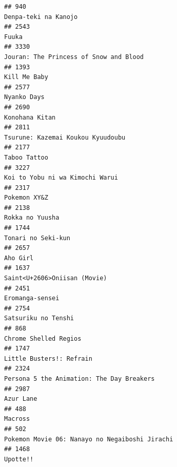 \documentclass[
]{article}
\begin{document}
\begin{verbatim}
## 940                                                                                       Denpa-teki na Kanojo
## 2543                                                                                                     Fuuka
## 3330                                                                    Jouran: The Princess of Snow and Blood
## 1393                                                                                              Kill Me Baby
## 2577                                                                                               Nyanko Days
## 2690                                                                                            Konohana Kitan
## 2811                                                                         Tsurune: Kazemai Koukou Kyuudoubu
## 2177                                                                                              Taboo Tattoo
## 3227                                                                           Koi to Yobu ni wa Kimochi Warui
## 2317                                                                                              Pokemon XY&Z
## 2138                                                                                           Rokka no Yuusha
## 1744                                                                                        Tonari no Seki-kun
## 2657                                                                                                  Aho Girl
## 1637                                                                              Saint<U+2606>Oniisan (Movie)
## 2451                                                                                           Eromanga-sensei
## 2754                                                                                       Satsuriku no Tenshi
## 868                                                                                      Chrome Shelled Regios
## 1747                                                                                  Little Busters!: Refrain
## 2324                                                                 Persona 5 the Animation: The Day Breakers
## 2987                                                                                                 Azur Lane
## 488                                                                                                    Macross
## 502                                                             Pokemon Movie 06: Nanayo no Negaiboshi Jirachi
## 1468                                                                                                  Upotte!!

\end{verbatim}
\end{document}
